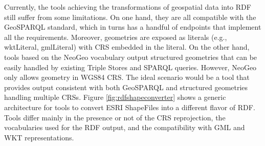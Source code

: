 Currently, the tools achieving the transformations of geospatial data into RDF still suffer from some limitations. On one hand, they are all compatible with the GeoSPARQL standard, which in turns has a handful of endpoints that implement all the requirements. Moreover, geometries are exposed as literals (e.g., wktLiteral, gmlLiteral) with CRS embedded in the literal. On the other hand, tools based on the NeoGeo vocabulary output structured geometries that can be easily handled by existing Triple Stores and SPARQL queries. However, NeoGeo only allows geometry in WGS84 CRS. The ideal scenario would be a tool that provides output consistent with both GeoSPARQL and structured geometries handling multiple CRSs.
Figure \ref{fig:rdfshapeconverter} shows a generic architecture for tools to convert ESRI ShapeFiles into a different flavor of RDF. Tools differ mainly in the presence or not of the CRS reprojection, the vocabularies used for the RDF output, and the compatibility with GML and WKT representations.

\begin{figure}[ht!b]
\end{figure}


